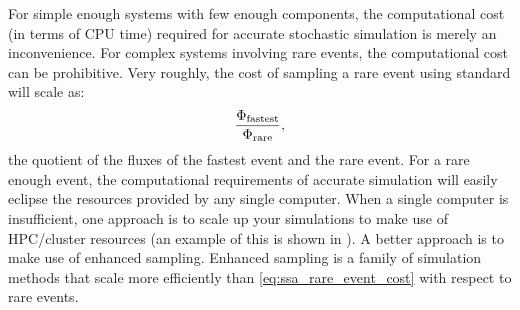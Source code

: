 For simple enough systems with few enough components, the computational cost (in terms of CPU time) required for accurate stochastic simulation is merely an inconvenience. For complex systems involving rare events, the computational cost can be prohibitive. Very roughly, the cost of sampling a rare event using standard  will scale as: 
\begin{equation}\label{eq:ssa_rare_event_cost}
    \frac{\Phi_{\textrm{fastest}}}{\Phi_{\textrm{rare}}}, 
\end{equation}
the quotient of the fluxes of the fastest event and the rare event. For a rare enough event, the computational requirements of accurate simulation will easily eclipse the resources provided by any single computer. When a single computer is insufficient, one approach is to scale up your simulations to make use of HPC/cluster resources (an example of this is shown in ). A better approach is to make use of enhanced sampling. Enhanced sampling is a family of simulation methods that scale more efficiently than \eqref{eq:ssa_rare_event_cost} with respect to rare events.







